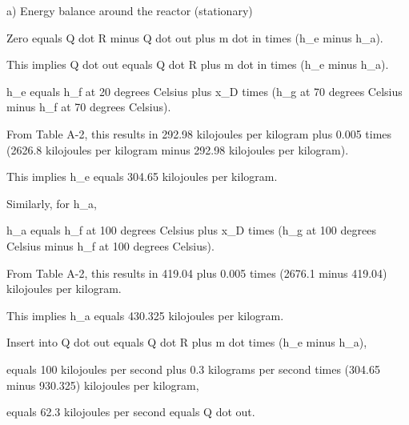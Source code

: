 a) Energy balance around the reactor (stationary)

Zero equals Q dot R minus Q dot out plus m dot in times (h_e minus h_a).

This implies Q dot out equals Q dot R plus m dot in times (h_e minus h_a).

h_e equals h_f at 20 degrees Celsius plus x_D times (h_g at 70 degrees Celsius minus h_f at 70 degrees Celsius).

From Table A-2, this results in 292.98 kilojoules per kilogram plus 0.005 times (2626.8 kilojoules per kilogram minus 292.98 kilojoules per kilogram).

This implies h_e equals 304.65 kilojoules per kilogram.

Similarly, for h_a,

h_a equals h_f at 100 degrees Celsius plus x_D times (h_g at 100 degrees Celsius minus h_f at 100 degrees Celsius).

From Table A-2, this results in 419.04 plus 0.005 times (2676.1 minus 419.04) kilojoules per kilogram.

This implies h_a equals 430.325 kilojoules per kilogram.

Insert into Q dot out equals Q dot R plus m dot times (h_e minus h_a),

equals 100 kilojoules per second plus 0.3 kilograms per second times (304.65 minus 930.325) kilojoules per kilogram,

equals 62.3 kilojoules per second equals Q dot out.